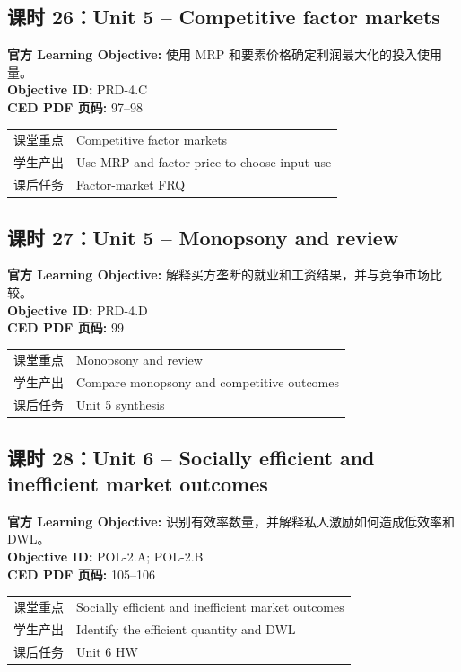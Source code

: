 \documentclass[11pt,a4paper]{ctexart}
\newcommand{\objectivebox}[1]{\noindent\colorbox{aplight}{\parbox{0.96\textwidth}{#1}}}
\begin{document}
\subsection{课时 26：Unit 5 -- Competitive factor markets}
\objectivebox{\textbf{官方 Learning Objective:} 使用 MRP 和要素价格确定利润最大化的投入使用量。\\\textbf{Objective ID:} PRD-4.C\\\textbf{CED PDF 页码:} 97–98}\par\vspace{0.4em}
\begin{tabularx}{\textwidth}{p{3.0cm}Y}
\toprule
课堂重点 & Competitive factor markets\\
学生产出 & Use MRP and factor price to choose input use\\
课后任务 & Factor-market FRQ\\
\bottomrule
\end{tabularx}
\subsection{课时 27：Unit 5 -- Monopsony and review}
\objectivebox{\textbf{官方 Learning Objective:} 解释买方垄断的就业和工资结果，并与竞争市场比较。\\\textbf{Objective ID:} PRD-4.D\\\textbf{CED PDF 页码:} 99}\par\vspace{0.4em}
\begin{tabularx}{\textwidth}{p{3.0cm}Y}
\toprule
课堂重点 & Monopsony and review\\
学生产出 & Compare monopsony and competitive outcomes\\
课后任务 & Unit 5 synthesis\\
\bottomrule
\end{tabularx}
\subsection{课时 28：Unit 6 -- Socially efficient and inefficient market outcomes}
\objectivebox{\textbf{官方 Learning Objective:} 识别有效率数量，并解释私人激励如何造成低效率和 DWL。\\\textbf{Objective ID:} POL-2.A; POL-2.B\\\textbf{CED PDF 页码:} 105–106}\par\vspace{0.4em}
\begin{tabularx}{\textwidth}{p{3.0cm}Y}
\toprule
课堂重点 & Socially efficient and inefficient market outcomes\\
学生产出 & Identify the efficient quantity and DWL\\
课后任务 & Unit 6 HW\\
\bottomrule
\end{tabularx}
\end{document}
